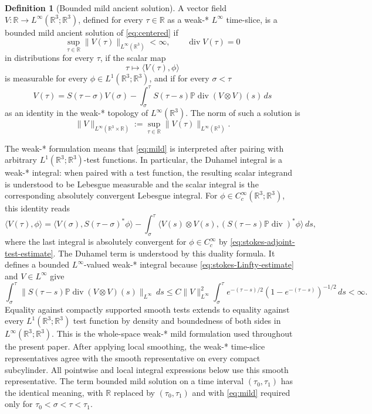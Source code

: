 \documentclass[11pt]{amsart}
\theoremstyle{plain}
\theoremstyle{definition}
\newtheorem{definition}[theorem]{Definition}
\theoremstyle{remark}
\numberwithin{equation}{section}
\begin{document}
\begin{definition}[Bounded mild ancient solution]\label{def:mild}
A vector field \(V:\mathbb R\to L^\infty(\mathbb R^3;\mathbb R^3)\), defined
for every \(\tau\in\mathbb R\) as a weak-* \(L^\infty\) time-slice, is a
bounded mild ancient solution of \eqref{eq:centered} if
\[
   \sup_{\tau\in\mathbb R}\|V(\tau)\|_{L^\infty(\mathbb R^3)}<\infty,
   \qquad \operatorname{div}V(\tau)=0
\]
in distributions for every \(\tau\), if the scalar map
\[
   \tau\mapsto \langle V(\tau),\phi\rangle
\]
is measurable for every \(\phi\in L^1(\mathbb R^3;\mathbb R^3)\), and if for
every \(\sigma<\tau\)
\begin{equation}\label{eq:mild}
   V(\tau)
   =
   S(\tau-\sigma)V(\sigma)
   -
   \int_\sigma^\tau
   S(\tau-s)\mathbb P\operatorname{div}(V\otimes V)(s)\,ds
\end{equation}
as an identity in the weak-* topology of \(L^\infty(\mathbb R^3)\).
The norm of such a solution is
\[
   \|V\|_{L^\infty(\mathbb R^3\times\mathbb R)}
   :=
   \sup_{\tau\in\mathbb R}\|V(\tau)\|_{L^\infty(\mathbb R^3)} .
\]
\end{definition}

The weak-* formulation means that \eqref{eq:mild} is interpreted after
pairing with arbitrary \(L^1(\mathbb R^3;\mathbb R^3)\)-test functions.  In
particular, the Duhamel integral is a weak-* integral: when paired with a test
function, the resulting scalar integrand is understood to be Lebesgue
measurable and the scalar integral is the corresponding absolutely convergent
Lebesgue integral.  For
\(\phi\in C_c^\infty(\mathbb R^3;\mathbb R^3)\), this identity reads
\[
   \langle V(\tau),\phi\rangle
   =
   \langle V(\sigma),S(\tau-\sigma)^*\phi\rangle
   -
   \int_\sigma^\tau
      \langle V(s)\otimes V(s),
      (S(\tau-s)\mathbb P\operatorname{div})^*\phi\rangle\,ds ,
\]
where the last integral is absolutely convergent for
\(\phi\in C_c^\infty\) by \eqref{eq:stokes-adjoint-test-estimate}.  The
Duhamel term is understood by this duality formula.  It defines a bounded
\(L^\infty\)-valued weak-* integral because
\eqref{eq:stokes-Linfty-estimate} and \(V\in L^\infty\) give
\[
   \int_\sigma^\tau
   \|S(\tau-s)\mathbb P\operatorname{div}(V\otimes V)(s)\|_{L^\infty}\,ds
   \le
   C\|V\|_{L^\infty}^2
   \int_\sigma^\tau
      e^{-(\tau-s)/2}(1-e^{-(\tau-s)})^{-1/2}\,ds<\infty .
\]
Equality against compactly supported smooth tests extends to equality against
every \(L^1(\mathbb R^3;\mathbb R^3)\) test function by density and boundedness
of both sides in \(L^\infty(\mathbb R^3;\mathbb R^3)\).  This is the
whole-space weak-* mild formulation used throughout the present paper.
After applying local smoothing, the weak-* time-slice representatives agree
with the smooth representative on every compact subcylinder.  All pointwise
and local integral expressions below use this smooth representative.
The term bounded mild solution on a time interval
\((\tau_0,\tau_1)\) has the identical meaning, with
\(\mathbb R\) replaced by \((\tau_0,\tau_1)\) and with \eqref{eq:mild}
required only for \(\tau_0<\sigma<\tau<\tau_1\).
\end{document}
